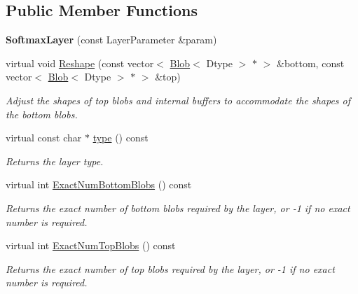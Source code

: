 \subsection*{Public Member Functions}
\begin{DoxyCompactItemize}
\item 
{\bfseries Softmax\+Layer} (const Layer\+Parameter \&param)\hypertarget{classcaffe_1_1SoftmaxLayer_a6a3b60c74c2c48e8d5f65595ec1b4268}{}\label{classcaffe_1_1SoftmaxLayer_a6a3b60c74c2c48e8d5f65595ec1b4268}

\item 
virtual void \hyperlink{classcaffe_1_1SoftmaxLayer_a729dbe97d52b7d7126d57f4cd52a541d}{Reshape} (const vector$<$ \hyperlink{classcaffe_1_1Blob}{Blob}$<$ Dtype $>$ $\ast$ $>$ \&bottom, const vector$<$ \hyperlink{classcaffe_1_1Blob}{Blob}$<$ Dtype $>$ $\ast$ $>$ \&top)
\begin{DoxyCompactList}\small\item\em Adjust the shapes of top blobs and internal buffers to accommodate the shapes of the bottom blobs. \end{DoxyCompactList}\item 
virtual const char $\ast$ \hyperlink{classcaffe_1_1SoftmaxLayer_a2cdff08f7968596a9b034f0459e0f3a2}{type} () const \hypertarget{classcaffe_1_1SoftmaxLayer_a2cdff08f7968596a9b034f0459e0f3a2}{}\label{classcaffe_1_1SoftmaxLayer_a2cdff08f7968596a9b034f0459e0f3a2}

\begin{DoxyCompactList}\small\item\em Returns the layer type. \end{DoxyCompactList}\item 
virtual int \hyperlink{classcaffe_1_1SoftmaxLayer_a6b8863006cf34812d01354b671406816}{Exact\+Num\+Bottom\+Blobs} () const 
\begin{DoxyCompactList}\small\item\em Returns the exact number of bottom blobs required by the layer, or -\/1 if no exact number is required. \end{DoxyCompactList}\item 
virtual int \hyperlink{classcaffe_1_1SoftmaxLayer_ae5c54555352700247a8fe47b73d06ce7}{Exact\+Num\+Top\+Blobs} () const 
\begin{DoxyCompactList}\small\item\em Returns the exact number of top blobs required by the layer, or -\/1 if no exact number is required. \end{DoxyCompactList}\end{DoxyCompactItemize}
